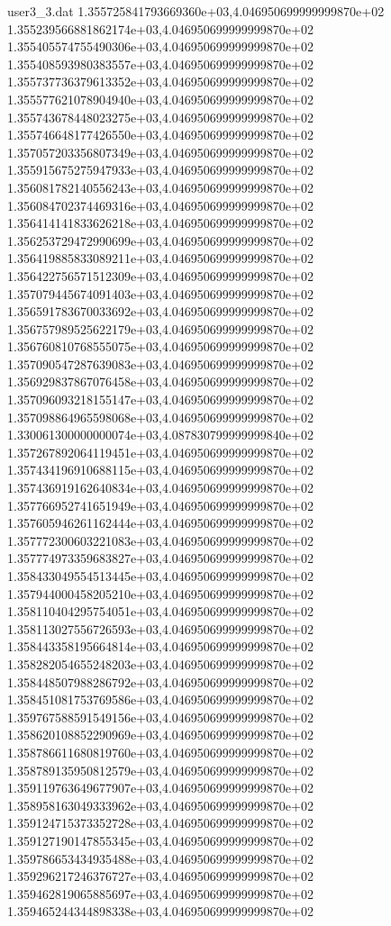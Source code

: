 \begin{filecontents}{user3_3.dat}
1.355725841793669360e+03,4.046950699999999870e+02
1.355239566881862174e+03,4.046950699999999870e+02
1.355405574755490306e+03,4.046950699999999870e+02
1.355408593980383557e+03,4.046950699999999870e+02
1.355737736379613352e+03,4.046950699999999870e+02
1.355577621078904940e+03,4.046950699999999870e+02
1.355743678448023275e+03,4.046950699999999870e+02
1.355746648177426550e+03,4.046950699999999870e+02
1.357057203356807349e+03,4.046950699999999870e+02
1.355915675275947933e+03,4.046950699999999870e+02
1.356081782140556243e+03,4.046950699999999870e+02
1.356084702374469316e+03,4.046950699999999870e+02
1.356414141833626218e+03,4.046950699999999870e+02
1.356253729472990699e+03,4.046950699999999870e+02
1.356419885833089211e+03,4.046950699999999870e+02
1.356422756571512309e+03,4.046950699999999870e+02
1.357079445674091403e+03,4.046950699999999870e+02
1.356591783670033692e+03,4.046950699999999870e+02
1.356757989525622179e+03,4.046950699999999870e+02
1.356760810768555075e+03,4.046950699999999870e+02
1.357090547287639083e+03,4.046950699999999870e+02
1.356929837867076458e+03,4.046950699999999870e+02
1.357096093218155147e+03,4.046950699999999870e+02
1.357098864965598068e+03,4.046950699999999870e+02
1.330061300000000074e+03,4.087830799999999840e+02
1.357267892064119451e+03,4.046950699999999870e+02
1.357434196910688115e+03,4.046950699999999870e+02
1.357436919162640834e+03,4.046950699999999870e+02
1.357766952741651949e+03,4.046950699999999870e+02
1.357605946261162444e+03,4.046950699999999870e+02
1.357772300603221083e+03,4.046950699999999870e+02
1.357774973359683827e+03,4.046950699999999870e+02
1.358433049554513445e+03,4.046950699999999870e+02
1.357944000458205210e+03,4.046950699999999870e+02
1.358110404295754051e+03,4.046950699999999870e+02
1.358113027556726593e+03,4.046950699999999870e+02
1.358443358195664814e+03,4.046950699999999870e+02
1.358282054655248203e+03,4.046950699999999870e+02
1.358448507988286792e+03,4.046950699999999870e+02
1.358451081753769586e+03,4.046950699999999870e+02
1.359767588591549156e+03,4.046950699999999870e+02
1.358620108852290969e+03,4.046950699999999870e+02
1.358786611680819760e+03,4.046950699999999870e+02
1.358789135950812579e+03,4.046950699999999870e+02
1.359119763649677907e+03,4.046950699999999870e+02
1.358958163049333962e+03,4.046950699999999870e+02
1.359124715373352728e+03,4.046950699999999870e+02
1.359127190147855345e+03,4.046950699999999870e+02
1.359786653434935488e+03,4.046950699999999870e+02
1.359296217246376727e+03,4.046950699999999870e+02
1.359462819065885697e+03,4.046950699999999870e+02
1.359465244344898338e+03,4.046950699999999870e+02

\end{filecontents}
